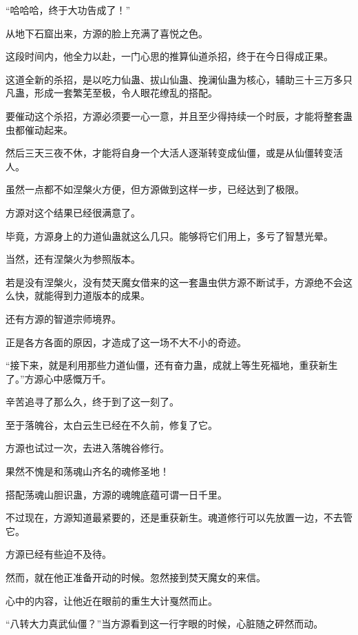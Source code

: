 
\begin{this_body}



“哈哈哈，终于大功告成了！”

从地下石窟出来，方源的脸上充满了喜悦之色。

这段时间内，他全力以赴，一门心思的推算仙道杀招，终于在今日得成正果。

这道全新的杀招，是以吃力仙蛊、拔山仙蛊、挽澜仙蛊为核心，辅助三十三万多只凡蛊，形成一套繁芜至极，令人眼花缭乱的搭配。

要催动这个杀招，方源必须要一心一意，并且至少得持续一个时辰，才能将整套蛊虫都催动起来。

然后三天三夜不休，才能将自身一个大活人逐渐转变成仙僵，或是从仙僵转变活人。

虽然一点都不如涅槃火方便，但方源做到这样一步，已经达到了极限。

方源对这个结果已经很满意了。

毕竟，方源身上的力道仙蛊就这么几只。能够将它们用上，多亏了智慧光晕。

当然，还有涅槃火为参照版本。

若是没有涅槃火，没有焚天魔女借来的这一套蛊虫供方源不断试手，方源绝不会这么快，就能得到力道版本的成果。

还有方源的智道宗师境界。

正是各方各面的原因，才造成了这一场不大不小的奇迹。

“接下来，就是利用那些力道仙僵，还有奋力蛊，成就上等生死福地，重获新生了。”方源心中感慨万千。

辛苦追寻了那么久，终于到了这一刻了。

至于落魄谷，太白云生已经在不久前，修复了它。

方源也试过一次，去进入落魄谷修行。

果然不愧是和荡魂山齐名的魂修圣地！

搭配荡魂山胆识蛊，方源的魂魄底蕴可谓一日千里。

不过现在，方源知道最紧要的，还是重获新生。魂道修行可以先放置一边，不去管它。

方源已经有些迫不及待。

然而，就在他正准备开动的时候。忽然接到焚天魔女的来信。

心中的内容，让他近在眼前的重生大计戛然而止。

“八转大力真武仙僵？”当方源看到这一行字眼的时候，心脏随之砰然而动。


\end{this_body}
